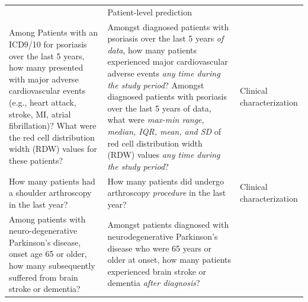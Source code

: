 \documentclass[11pt]{book}
\theoremstyle{definition}
\theoremstyle{definition}
\theoremstyle{definition}
\theoremstyle{remark}
\begin{document}
\begin{longtable}[]{@{}lll@{}}
\begin{minipage}[t]{0.30\columnwidth}
\end{minipage} & \begin{minipage}[t]{0.30\columnwidth}\raggedright
Patient-level prediction\strut
\end{minipage}\tabularnewline
\begin{minipage}[t]{0.30\columnwidth}\raggedright
Among Patients with an ICD9/10 for psoriasis over the last 5 years, how many presented with major adverse cardiovascular events (e.g., heart attack, stroke, MI, atrial fibrillation)? What were the red cell distribution width (RDW) values for these patients?\strut
\end{minipage} & \begin{minipage}[t]{0.30\columnwidth}\raggedright
Amongst diagnosed patients with psoriasis over the last 5 years \emph{of data}, how many patients experienced major cardiovascular adverse events \emph{any time during the study period}? Amongst diagnosed patients with psoriasis over the last 5 years of data, what were \emph{max-min range, median, IQR, mean, and SD} of red cell distribution width (RDW) values \emph{any time during the study period}?\strut
\end{minipage} & \begin{minipage}[t]{0.30\columnwidth}\raggedright
Clinical characterization\strut
\end{minipage}\tabularnewline
\begin{minipage}[t]{0.30\columnwidth}\raggedright
How many patients had a shoulder arthroscopy in the last year?\strut
\end{minipage} & \begin{minipage}[t]{0.30\columnwidth}\raggedright
How many patients did undergo arthroscopy \emph{procedure} in the last year?\strut
\end{minipage} & \begin{minipage}[t]{0.30\columnwidth}\raggedright
Clinical characterization\strut
\end{minipage}\tabularnewline
\begin{minipage}[t]{0.30\columnwidth}\raggedright
Among patients with neuro-degenerative Parkinson's disease, onset age 65 or older, how many subsequently suffered from brain stroke or dementia?\strut
\end{minipage} & \begin{minipage}[t]{0.30\columnwidth}\raggedright
Amongst patients diagnosed with neurodegenerative Parkinson's disease who were 65 years or older at onset, how many patients experienced brain stroke or dementia \emph{after diagnosis}?\strut

\end{minipage}
\end{longtable}
\end{document}
